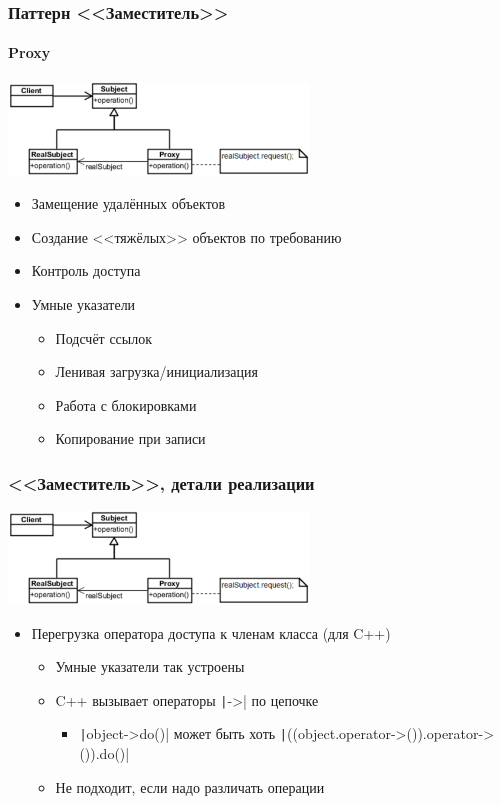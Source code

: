 \documentclass{../../slides-style}
\begin{document}
    \begin{frame}
        \frametitle{Паттерн <<Заместитель>>}
        \framesubtitle{Proxy}
        \begin{center}
            \includegraphics[width=0.6\textwidth]{proxy.png}
        \end{center}
        \begin{itemize}
            \item Замещение удалённых объектов
            \item Создание <<тяжёлых>> объектов по требованию
            \item Контроль доступа
            \item Умные указатели
            \begin{itemize}
                \item Подсчёт ссылок
                \item Ленивая загрузка/инициализация
                \item Работа с блокировками
                \item Копирование при записи
            \end{itemize}
        \end{itemize}
    \end{frame}

    \begin{frame}
        \frametitle{<<Заместитель>>, детали реализации}
        \begin{center}
            \includegraphics[width=0.6\textwidth]{proxy.png}
        \end{center}
        \begin{itemize}
            \item Перегрузка оператора доступа к членам класса (для C++)
            \begin{itemize}
                \item Умные указатели так устроены
                \item C++ вызывает операторы \texttt|->| по цепочке
                \begin{itemize}
                    \item \texttt|object->do()| может быть хоть \texttt|((object.operator->()).operator->()).do()|
                \end{itemize}
                \item Не подходит, если надо различать операции
            \end{itemize}
        \end{itemize}
    \end{frame}
\end{document}
